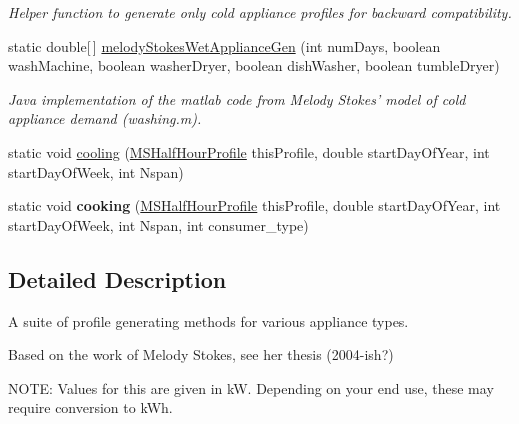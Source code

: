 \begin{DoxyCompactItemize}
\begin{DoxyCompactList}\small\item\em Helper function to generate only cold appliance profiles for backward compatibility. \end{DoxyCompactList}\item 
static double\mbox{[}$\,$\mbox{]} \hyperlink{classuk_1_1ac_1_1dmu_1_1iesd_1_1cascade_1_1util_1_1profilegenerators_1_1_melody_stokes_generator_afad8310ea2dd0116db2d22f1378af902}{melody\-Stokes\-Wet\-Appliance\-Gen} (int num\-Days, boolean wash\-Machine, boolean washer\-Dryer, boolean dish\-Washer, boolean tumble\-Dryer)
\begin{DoxyCompactList}\small\item\em Java implementation of the matlab code from Melody Stokes' model of cold appliance demand (washing.\-m). \end{DoxyCompactList}\item 
static void \hyperlink{classuk_1_1ac_1_1dmu_1_1iesd_1_1cascade_1_1util_1_1profilegenerators_1_1_melody_stokes_generator_af9fbf606ec8e3f776d8578c40a503d8f}{cooling} (\hyperlink{classuk_1_1ac_1_1dmu_1_1iesd_1_1cascade_1_1util_1_1profilegenerators_1_1_m_s_half_hour_profile}{M\-S\-Half\-Hour\-Profile} this\-Profile, double start\-Day\-Of\-Year, int start\-Day\-Of\-Week, int Nspan)
\item 
\hypertarget{classuk_1_1ac_1_1dmu_1_1iesd_1_1cascade_1_1util_1_1profilegenerators_1_1_melody_stokes_generator_ae2dc15a883f7c70b90a84861744d3581}{static void {\bfseries cooking} (\hyperlink{classuk_1_1ac_1_1dmu_1_1iesd_1_1cascade_1_1util_1_1profilegenerators_1_1_m_s_half_hour_profile}{M\-S\-Half\-Hour\-Profile} this\-Profile, double start\-Day\-Of\-Year, int start\-Day\-Of\-Week, int Nspan, int consumer\-\_\-type)}\label{classuk_1_1ac_1_1dmu_1_1iesd_1_1cascade_1_1util_1_1profilegenerators_1_1_melody_stokes_generator_ae2dc15a883f7c70b90a84861744d3581}

\end{DoxyCompactItemize}


\subsection{Detailed Description}
A suite of profile generating methods for various appliance types. 

Based on the work of Melody Stokes, see her thesis (2004-\/ish?)

N\-O\-T\-E\-: Values for this are given in k\-W. Depending on your end use, these may require conversion to k\-Wh.

